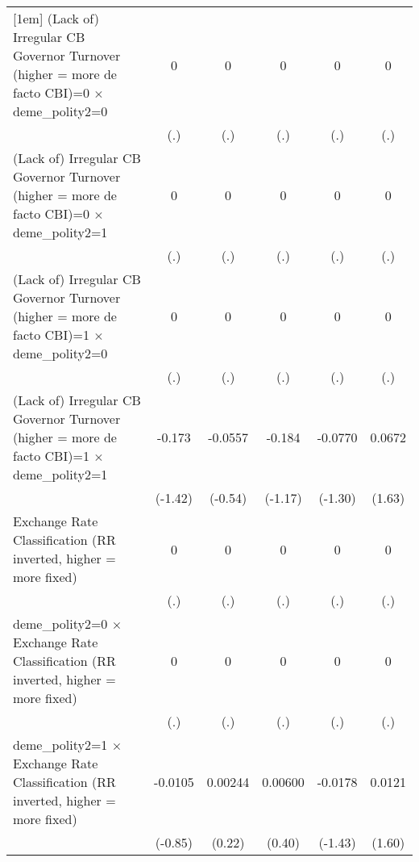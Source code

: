 {\begin{tabular*}{\linewidth}{@{\hskip\tabcolsep\extracolsep\fill}l*{5}{c}}
[1em]
(Lack of) Irregular CB Governor Turnover (higher = more de facto CBI)=0 $\times$ deme\_polity2=0&        0         &        0         &        0         &        0         &        0         \\
                &      (.)         &      (.)         &      (.)         &      (.)         &      (.)         \\
[1em]
(Lack of) Irregular CB Governor Turnover (higher = more de facto CBI)=0 $\times$ deme\_polity2=1&        0         &        0         &        0         &        0         &        0         \\
                &      (.)         &      (.)         &      (.)         &      (.)         &      (.)         \\
[1em]
(Lack of) Irregular CB Governor Turnover (higher = more de facto CBI)=1 $\times$ deme\_polity2=0&        0         &        0         &        0         &        0         &        0         \\
                &      (.)         &      (.)         &      (.)         &      (.)         &      (.)         \\
[1em]
(Lack of) Irregular CB Governor Turnover (higher = more de facto CBI)=1 $\times$ deme\_polity2=1&   -0.173         &  -0.0557         &   -0.184         &  -0.0770         &   0.0672         \\
                &  (-1.42)         &  (-0.54)         &  (-1.17)         &  (-1.30)         &   (1.63)         \\
[1em]
Exchange Rate Classification (RR inverted, higher = more fixed)&        0         &        0         &        0         &        0         &        0         \\
                &      (.)         &      (.)         &      (.)         &      (.)         &      (.)         \\
[1em]
deme\_polity2=0 $\times$ Exchange Rate Classification (RR inverted, higher = more fixed)&        0         &        0         &        0         &        0         &        0         \\
                &      (.)         &      (.)         &      (.)         &      (.)         &      (.)         \\
[1em]
deme\_polity2=1 $\times$ Exchange Rate Classification (RR inverted, higher = more fixed)&  -0.0105         &  0.00244         &  0.00600         &  -0.0178         &   0.0121         \\
                &  (-0.85)         &   (0.22)         &   (0.40)         &  (-1.43)         &   (1.60)         \\

\end{tabular*}}
